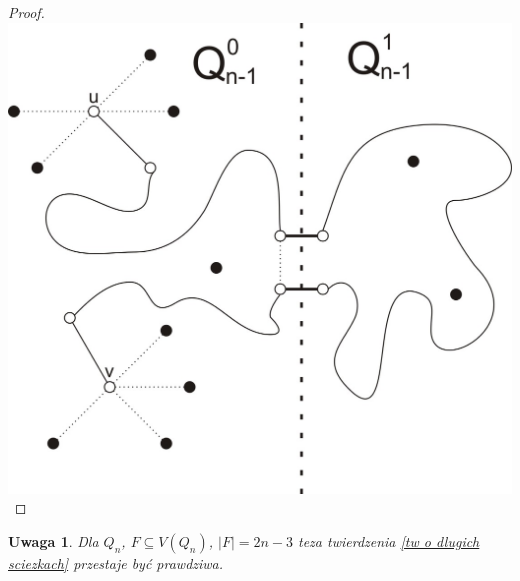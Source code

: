 \documentclass{pracamgr}
\newtheorem{remark}[theorem]{Uwaga}
\begin{document}
\begin{proof}
   \includegraphics[scale=0.5]{img/sciezka_laczenie2.jpg}
   \end{proof}
   \begin{remark}\label{dluga sciezka 2n-3 za duzo}
    Dla $Q_n$, $F\subseteq V(Q_n)$, $|F|=2n-3$ teza twierdzenia \ref{tw o dlugich sciezkach} przestaje być prawdziwa.
   \end{remark}
\end{document}
